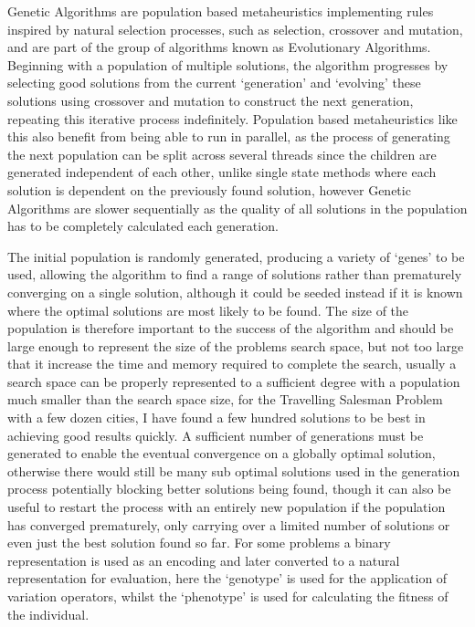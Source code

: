 \documentclass[]{final_report}
\begin{document}
Genetic Algorithms are population based metaheuristics implementing rules inspired by natural selection processes, such as selection, crossover and mutation, and are part of the group of algorithms known as Evolutionary Algorithms. Beginning with a population of multiple solutions, the algorithm progresses by selecting good solutions from the current `generation' and `evolving' these solutions using crossover and mutation to construct the next generation, repeating this iterative process indefinitely. Population based metaheuristics like this also benefit from being able to run in parallel, as the process of generating the next population can be split across several threads since the children are generated independent of each other, unlike single state methods where each solution is dependent on the previously found solution, however Genetic Algorithms are slower sequentially as the quality of all solutions in the population has to be completely calculated each generation.

The initial population is randomly generated, producing a variety of `genes' to be used, allowing the algorithm to find a range of solutions rather than prematurely converging on a single solution, although it could be seeded instead if it is known where the optimal solutions are most likely to be found. The size of the population is therefore important to the success of the algorithm and should be large enough to represent the size of the problems search space, but not too large that it increase the time and memory required to complete the search, usually a search space can be properly represented to a sufficient degree with a population much smaller than the search space size, for the Travelling Salesman Problem with a few dozen cities, I have found a few hundred solutions to be best in achieving good results quickly. A sufficient number of generations must be generated to enable the eventual convergence on a globally optimal solution, otherwise there would still be many sub optimal solutions used in the generation process potentially blocking better solutions being found, though it can also be useful to restart the process with an entirely new population if the population has converged prematurely, only carrying over a limited number of solutions or even just the best solution found so far. For some problems a binary representation is used as an encoding and later converted to a natural representation for evaluation, here the `genotype' is used for the application of variation operators, whilst the `phenotype' is used for calculating the fitness of the individual.
\end{document}
